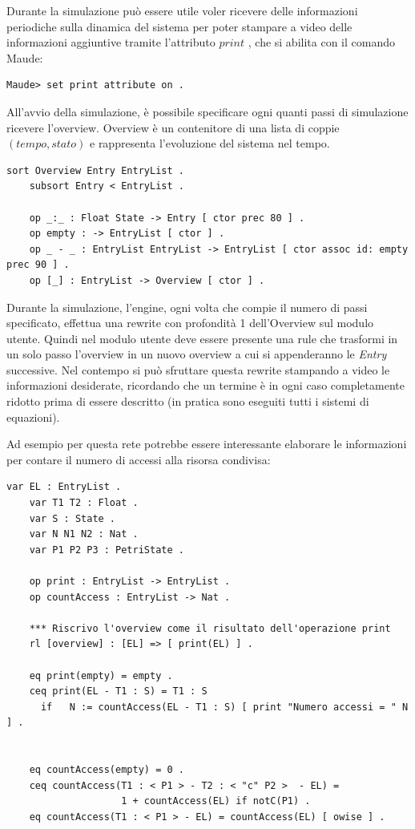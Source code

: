 Durante la simulazione può essere utile voler ricevere delle informazioni
periodiche sulla dinamica del sistema per poter stampare a video delle
informazioni aggiuntive tramite l'attributo $print$ \cite{maudemanual}, che si
abilita con il comando Maude:
\begin{Verbatim}[fontsize=\small]
Maude> set print attribute on .
\end{Verbatim}

All'avvio della simulazione, è possibile specificare ogni quanti passi di
simulazione ricevere l'overview. Overview è un contenitore di una lista di
coppie $(tempo, stato)$ e rappresenta l'evoluzione del sistema nel tempo.
\begin{Verbatim}[fontsize=\small]
	sort Overview Entry EntryList .
	subsort Entry < EntryList .
	
	op _:_ : Float State -> Entry [ ctor prec 80 ] .
	op empty : -> EntryList [ ctor ] .
	op _ - _ : EntryList EntryList -> EntryList [ ctor assoc id: empty prec 90 ] .
	op [_] : EntryList -> Overview [ ctor ] .
\end{Verbatim}
Durante la simulazione, l'engine, ogni volta che compie il numero di passi
specificato, effettua una rewrite con profondità 1 dell'Overview sul modulo
utente. Quindi nel modulo utente deve essere presente una rule che trasformi in
un solo passo l'overview in un nuovo overview a cui si appenderanno le
\emph{Entry} successive. Nel contempo si può sfruttare questa rewrite stampando
a video le informazioni desiderate, ricordando che un termine è in ogni caso
completamente ridotto prima di essere descritto (in pratica sono eseguiti tutti
i sistemi di equazioni).

Ad esempio per questa rete potrebbe essere interessante elaborare le
informazioni per contare il numero di accessi alla risorsa condivisa:
\begin{Verbatim}[fontsize=\small]
	var EL : EntryList .
	var T1 T2 : Float .
	var S : State .
	var N N1 N2 : Nat .
	var P1 P2 P3 : PetriState .
	
	op print : EntryList -> EntryList .
	op countAccess : EntryList -> Nat .
	
	*** Riscrivo l'overview come il risultato dell'operazione print
	rl [overview] : [EL] => [ print(EL) ] .
	
	eq print(empty) = empty .
	ceq print(EL - T1 : S) = T1 : S
	  if   N := countAccess(EL - T1 : S) [ print "Numero accessi = " N ] .
	
	
	eq countAccess(empty) = 0 .
	ceq countAccess(T1 : < P1 > - T2 : < "c" P2 >  - EL) =
	                1 + countAccess(EL) if notC(P1) .
	eq countAccess(T1 : < P1 > - EL) = countAccess(EL) [ owise ] .
\end{Verbatim}

